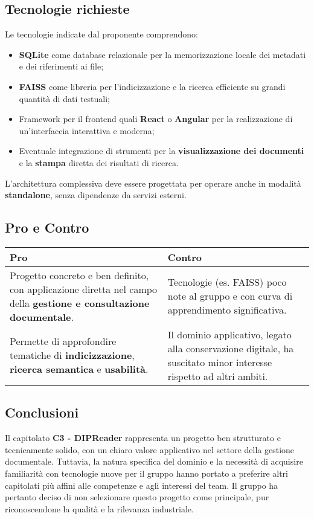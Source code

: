 \documentclass[a4paper,12pt]{article}
\begin{document}
{{    \subsection{Tecnologie richieste}
        Le tecnologie indicate dal proponente comprendono:
        \begin{itemize}
            \item \textbf{SQLite} come database relazionale per la memorizzazione locale dei metadati e dei riferimenti ai file;
            \item \textbf{FAISS} come libreria per l’indicizzazione e la ricerca efficiente su grandi quantità di dati testuali;
            \item Framework per il frontend quali \textbf{React} o \textbf{Angular} per la realizzazione di un’interfaccia interattiva e moderna;
            \item Eventuale integrazione di strumenti per la \textbf{visualizzazione dei documenti} e la \textbf{stampa} diretta dei risultati di ricerca.
        \end{itemize}
        L’architettura complessiva deve essere progettata per operare anche in modalità \textbf{standalone}, senza dipendenze da servizi esterni.
    

    \subsection{Pro e Contro}
        \begin{center}
            \begin{tabular}{|p{9cm}|p{5cm}|}
                \hline
                \textbf{Pro} & \textbf{Contro} \\
                \hline
                Progetto concreto e ben definito, con applicazione diretta nel campo della \textbf{gestione e consultazione documentale}. & Tecnologie (es. FAISS) poco note al gruppo e con curva di apprendimento significativa. \\
                \hline
                Permette di approfondire tematiche di \textbf{indicizzazione}, \textbf{ricerca semantica} e \textbf{usabilità}. & Il dominio applicativo, legato alla conservazione digitale, ha suscitato minor interesse rispetto ad altri ambiti. \\
                \hline
            \end{tabular}
        \end{center}
    

    \subsection{Conclusioni}
        Il capitolato \textbf{C3 - DIPReader} rappresenta un progetto ben strutturato e tecnicamente solido, con un chiaro valore applicativo nel settore della gestione documentale.
        Tuttavia, la natura specifica del dominio e la necessità di acquisire familiarità con tecnologie nuove per il gruppo hanno portato a preferire altri capitolati più affini alle competenze e agli interessi del team.
        Il gruppo ha pertanto deciso di non selezionare questo progetto come principale, pur riconoscendone la qualità e la rilevanza industriale.
    


}}
\end{document}
